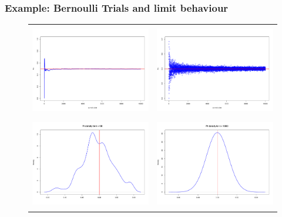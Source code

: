 \documentclass[notes=show,smaller,handout]{beamer}
\begin{document}
\begin{frame}%

\frametitle{Example: Bernoulli Trials and limit behaviour}

\begin{figure}[ptb]\centering
\begin{tabular} {cc}
\includegraphics[height=1.56in, width=2.2in]{OneSample_Pn.pdf} &
\includegraphics[height=1.56in, width=2.2in]{ManySamples_Pn.pdf} \\
\includegraphics[height=1.56in, width=2.2in]{NonGauss_Pn.pdf} &
\includegraphics[height=1.56in, width=2.2in]{Gauss_Pn.pdf}
\end{tabular}
\end{figure}%


\end{frame}%
\end{document}
